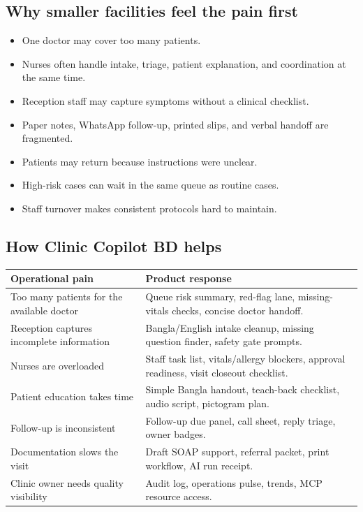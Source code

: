 \documentclass[11pt,letterpaper]{article}
\begin{document}
\subsection{Why smaller facilities feel the pain first}

\begin{itemize}
  \item One doctor may cover too many patients.
  \item Nurses often handle intake, triage, patient explanation, and coordination at the same time.
  \item Reception staff may capture symptoms without a clinical checklist.
  \item Paper notes, WhatsApp follow-up, printed slips, and verbal handoff are fragmented.
  \item Patients may return because instructions were unclear.
  \item High-risk cases can wait in the same queue as routine cases.
  \item Staff turnover makes consistent protocols hard to maintain.
\end{itemize}

\subsection{How Clinic Copilot BD helps}

\begin{table}[H]
\centering
\begin{tabularx}{\linewidth}{@{}L{2.3in}Y@{}}
\toprule
\textbf{Operational pain} & \textbf{Product response} \\
\midrule
Too many patients for the available doctor & Queue risk summary, red-flag lane, missing-vitals checks, concise doctor handoff. \\
Reception captures incomplete information & Bangla/English intake cleanup, missing question finder, safety gate prompts. \\
Nurses are overloaded & Staff task list, vitals/allergy blockers, approval readiness, visit closeout checklist. \\
Patient education takes time & Simple Bangla handout, teach-back checklist, audio script, pictogram plan. \\
Follow-up is inconsistent & Follow-up due panel, call sheet, reply triage, owner badges. \\
Documentation slows the visit & Draft SOAP support, referral packet, print workflow, AI run receipt. \\
Clinic owner needs quality visibility & Audit log, operations pulse, trends, MCP resource access. \\
\bottomrule
\end{tabularx}
\end{table}
\end{document}

